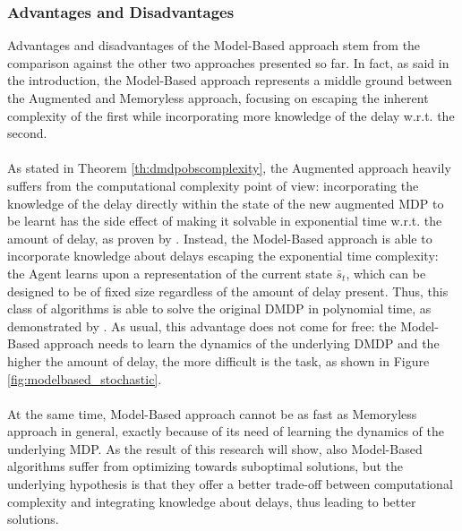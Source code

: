            \subsubsection{Advantages and Disadvantages}
                Advantages and disadvantages of the Model-Based approach stem from the comparison against the other two approaches presented so far. In fact, as said in the introduction, the Model-Based approach represents a middle ground between the Augmented and Memoryless approach, focusing on escaping the inherent complexity of the first while incorporating more knowledge of the delay w.r.t. the second. 
                \\\\
                As stated in Theorem \ref{th:dmdpobscomplexity}, the Augmented approach heavily suffers from the computational complexity point of view: incorporating the knowledge of the delay directly within the state of the new augmented MDP to be learnt has the side effect of making it solvable in exponential time w.r.t. the amount of delay, as proven by . Instead, the Model-Based approach is able to incorporate knowledge about delays escaping the exponential time complexity: the Agent learns upon a representation of the current state $\bar{s}_t$, which can be designed to be of fixed size regardless of the amount of delay present. Thus, this class of algorithms is able to solve the original DMDP in polynomial time, as demonstrated by . As usual, this advantage does not come for free: the Model-Based approach needs to learn the dynamics of the underlying DMDP and the higher the amount of delay, the more difficult is the task, as shown in Figure \ref{fig:modelbased_stochastic}.
                \\\\
                At the same time, Model-Based approach cannot be as fast as Memoryless approach in general, exactly because of its need of learning the dynamics of the underlying MDP. As the result of this research will show, also Model-Based algorithms suffer from optimizing towards suboptimal solutions, but the underlying hypothesis is that they offer a better trade-off between computational complexity and integrating knowledge about delays, thus leading to better solutions.
                \\\\
